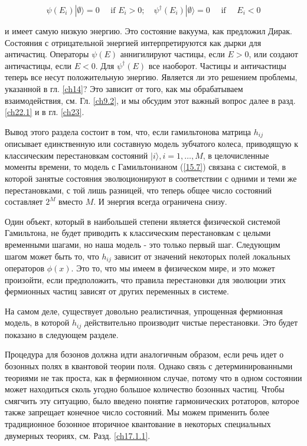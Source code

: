 \documentclass[main.tex]{subfiles}
\begin{document}
\begin{equation}\label{15.12}
	\psi\left(E_{i}\right)|\emptyset\rangle= 0 \quad \text { if } E_{i}>0 ; \quad \psi^{\dagger}\left(E_{i}\right)|\emptyset\rangle= 0 \quad \text { if } \quad E_{i}<0
\end{equation}

и имеет самую низкую энергию. Это состояние вакуума, как предложил Дирак. Состояния с отрицательной энергией интерпретируются как дырки для античастиц. Операторы $\psi(E)$ аннигилируют частицы, если $E> 0$, или создают античастицы, если $E <0$. Для $\psi^\dagger(E)$ все наоборот. Частицы и античастицы теперь все несут положительную энергию. Является ли это решением проблемы, указанной в гл. \ref{ch14}? Это зависит от того, как мы обрабатываем взаимодействия, см. Гл. \ref{ch9.2}, и мы обсудим этот важный вопрос далее в разд. \ref{ch22.1} и в гл. \ref{ch23}.

Вывод этого раздела состоит в том, что, если гамильтонова матрица $h_{ij}$ описывает единственную или составную модель зубчатого колеса, приводящую к классическим перестановкам состояний $| i\rangle, i = 1,\ldots, M$, в целочисленные моменты времени, то модель с Гамильтонианом (\ref{15.7}) связана с системой, в которой занятые состояния эволюционируют в соответствии с одними и теми же перестановками, с той лишь разницей, что теперь общее число состояний составляет $2^M$ вместо $M$. И энергия всегда ограничена снизу.

Один объект, который в наибольшей степени является физической системой Гамильтона, не будет приводить к классическим перестановкам с целыми временными шагами, но наша модель - это только первый шаг. Следующим шагом может быть то, что $h_{ij}$ зависит от значений некоторых полей локальных операторов $\phi(x)$. Это то, что мы имеем в физическом мире, и это может произойти, если предположить, что правила перестановки для эволюции этих фермионных частиц зависят от других переменных в системе.

На самом деле, существует довольно реалистичная, упрощенная фермионная модель, в которой $h_{ij}$ действительно производит чистые перестановки. Это будет показано в следующем разделе.

Процедура для бозонов должна идти аналогичным образом, если речь идет о бозонных полях в квантовой теории поля. Однако связь с детерминированными теориями не так проста, как в фермионном случае, потому что в одном состоянии может находиться сколь угодно большое количество бозонных частиц. Чтобы смягчить эту ситуацию, было введено понятие гармонических ротаторов, которое также запрещает конечное число состояний. Мы можем применить более традиционное бозонное вторичное квантование в некоторых специальных двумерных теориях, см. Разд. \ref{ch17.1.1}.
\end{document}
